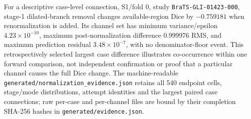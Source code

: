 \documentclass[mathematics,article,submit,pdftex,moreauthors]{Definitions/mdpi}
\begin{document}
For a descriptive case-level connection, S1/fold 0, study
\nolinkurl{BraTS-GLI-01423-000}, stage-1 dilated-branch removal changes
available-region Dice by $-0.759181$ when renormalization is added. Its
channel set has minimum variance/epsilon $4.23\times10^{-10}$, maximum
post-normalization difference 0.999976 RMS, and maximum prediction residual
$3.48\times10^{-7}$, with no denominator-floor event. This retrospectively
selected largest case difference illustrates co-occurrence within one
forward comparison, not independent confirmation or proof that a particular
channel causes the full Dice change. The machine-readable
\nolinkurl{generated/normalization_evidence.json} retains all 540 endpoint
cells, stage/mode distributions, attempt identities and the largest paired
case connections; raw per-case and per-channel files are bound by their
completion SHA-256 hashes in \nolinkurl{generated/evidence.json}.

\end{document}
